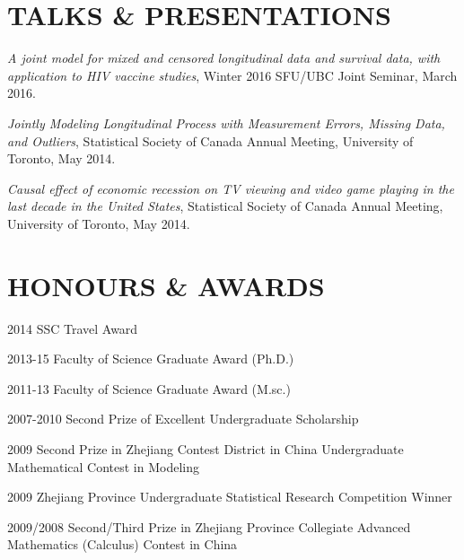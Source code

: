 \documentclass[margin]{res}
\begin{document}
\begin{resume}
\section{TALKS \&  PRESENTATIONS}  

{\it A joint model for mixed and censored longitudinal data and survival data, with application to HIV vaccine studies}, 
Winter 2016 SFU/UBC Joint Seminar, March 2016.

{\it Jointly Modeling Longitudinal Process with Measurement Errors, Missing Data, and Outliers},
Statistical Society of Canada Annual Meeting, University of Toronto, May 2014.

{\it Causal effect of economic recession on TV viewing and video game playing in the last decade in the United States}, Statistical Society of Canada Annual Meeting, University of Toronto, May 2014.



\section{HONOURS \&  AWARDS}
 2014 SSC Travel Award

 2013-15 Faculty of Science Graduate Award (Ph.D.)

 2011-13 Faculty of Science Graduate Award (M.sc.)

 2007-2010 Second Prize of Excellent Undergraduate Scholarship 

 2009 Second Prize in Zhejiang Contest District in China Undergraduate Mathematical Contest in Modeling

 2009 Zhejiang Province Undergraduate Statistical Research Competition Winner

  2009/2008 Second/Third Prize in Zhejiang Province Collegiate Advanced Mathematics (Calculus)
Contest in China


\end{resume}
\end{document}
